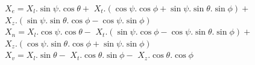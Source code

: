 
$X_e = X_l.\sin\psi.\cos\theta +$
        $X_t.(\cos\psi.\cos\phi+\sin\psi.\sin\theta.\sin\phi) +$
        $X_z.(\sin\psi.\sin\theta.\cos\phi - \cos\psi.\sin\phi)$ \\   

$X_n = X_l.\cos\psi.\cos\theta -$
        $X_t.(\sin\psi.\cos\phi - \cos\psi.\sin\theta.\sin\phi) +$
        $X_z.(\cos\psi.\sin\theta.\cos\phi + \sin\psi.\sin\phi)$\\

$X_v = X_l.\sin\theta -$ 
        $X_t.\cos\theta.\sin\phi -$
        $X_z.\cos\theta.\cos\phi$ \\


